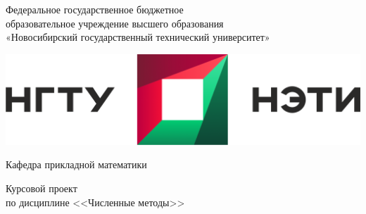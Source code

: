 \documentclass[12pt,a4paper]{article}
\begin{document}
\begin{center}
\begin{large}

\vspace{8mm}



Федеральное государственное бюджетное  \\
образовательное учреждение высшего образования \\
«Новосибирский государственный технический университет» \\

\vspace{12mm}




\includegraphics[scale=0.35]{images/nstu_emblem_with_title}

\vspace{8mm}


Кафедра прикладной математики

\vspace{4mm}


Курсовой проект\\


по дисциплине <<Численные методы>> \\ %

\vspace{16mm}

\end{large}




\end{center}
\end{document}
